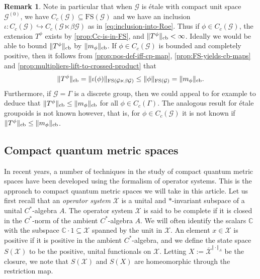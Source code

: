 \documentclass[11pt,a4paper,oneside,final,reqno]{amsart}
\theoremstyle{definition}
\newtheorem{remark}[lemma]{Remark}
\newcommand{\G}{\mathcal{G}}
\newcommand{\Go}{\mathcal{G}^{(0)}}
\newcommand{\cX}{\mathcal{X}}
\newcommand{\FS}{\mathrm{FS}}
\newcommand{\C}{\mathbb{C}}
\numberwithin{equation}{section}
\begin{document}
	\begin{remark}\label{remark:existence-and-boundedness-of-Tphi}
	Note in particular that when $\G$ is \'etale with compact unit space $\Go$, we have $C_c (\G) \subseteq \FS(\G)$ and we have an inclusion $\iota \colon C_c (\G) \hookrightarrow C_c(\G \ltimes \beta \G)$ as in \eqref{eq:inclusion-into-Roe}. Thus if $\phi \in C_c (\G)$, the extension $T^\phi$ exists by \cref{prop:Cc-is-in-FS}, and $\Vert T^\phi \Vert_{\rm cb} < \infty$. Ideally we would be able to bound $\Vert T^\phi \Vert_{\rm cb}$ by $\Vert m_\phi \Vert_{\rm cb}$. If $\phi \in C_c(\G)$ is bounded and completely positive, then it follows from \cref{prop:pos-def-iff-cp-map}, \cref{prop:FS-yields-cb-maps} and \cref{prop:multipliers-lift-to-crossed-product} that
	\begin{align*}
		\Vert T^\phi \Vert_{\rm cb} = \Vert \iota(\phi) \Vert_{\FS(\G \ltimes \beta \G)} \leq \Vert \phi \Vert_{\FS(\G)} = \Vert m_\phi \Vert_{\rm cb}.
	\end{align*}
	Furthermore, if $\G = \Gamma$ is a discrete group, then we could appeal to for example \cite[Corollary 4.7]{BedosConti2015} to deduce that $\Vert T^\phi \Vert_{\rm cb} \leq \Vert m_\phi \Vert_{\rm cb}$ for all $\phi \in C_c(\Gamma)$. The analogous result for \'etale groupoids is not known however, that is, for $\phi \in C_c(\G)$ it is not known if $\Vert T^\phi \Vert_{\rm cb} \leq \Vert m_{\phi}\Vert_{\rm cb}$.
\end{remark}
	
	
	
	
	
	\subsection{Compact quantum metric spaces}\label{sec:prelims-CQMS}
	In recent years, a number of techniques in the study of compact quantum metric spaces have been developed using the formalism of operator systems. 
	This is the approach to compact quantum metric spaces we will take in this article. 
	Let us first recall that
	an \emph{operator system} $\cX$ is a unital and $*$-invariant subspace of a unital $C^*$-algebra $A$. The operator system $\cX$ is said to be complete if it is closed in the $C^*$-norm of the ambient $C^*$-algebra $A$. We will often identify the scalars $\C$ with the subspace $\C \cdot 1 \subseteq \cX$ spanned by the unit in $\cX$. 
	An element $x \in \cX$ is positive if it is positive in the ambient $C^*$-algebra, and we define the state space $S(\cX)$ to be the positive, unital functionals on $\cX$. Letting $X := \overline{\cX}^{\Vert \cdot \Vert_A}$ be the closure, we note that $S(\cX)$ and $S(X)$ are homeomorphic through the restriction map. 
	
\end{document}
